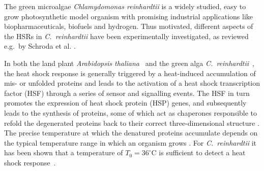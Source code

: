 \documentclass[oneside, 10pt, a4paper, twocolumn]{article}
\begin{document}
The green microalgae \emph{Chlamydomonas reinhardtii} %
is a widely studied, easy to grow photosynthetic model organism with promising  industrial applications like biopharmaceuticals, biofuels and hydrogen. 
Thus motivated, different aspects of the HSRs in \emph{C.~reinhardtii} have been experimentally investigated, as reviewed e.g.~by Schroda et al. \cite{Schroda2015}.


In both the land plant \textit{Arabidopsis thaliana}~\cite{Kurepa2003,Sugio2009} and the green alga \textit{C.~reinhardtii}~\cite{Schmollinger2013},
the heat shock response is generally triggered by a heat-induced accumulation of mis- or unfolded proteins
and leads to the activation
of a heat shock transcription factor (HSF)  through a series of sensor and signalling events. The HSF in turn promotes the expression of 
heat shock protein (HSP) genes, and subsequently leads to the synthesis of proteins, some of which act as chaperones responsible to refold the degenerated proteins back to
their correct three-dimensional structure \cite{Craig1993}. 
The precise temperature at which the denatured proteins accumulate depends on the typical temperature range
in which an organism grows \cite{Lindquist1988}. 
For \textit{C.~reinhardtii}
it has been shown that a temperature of $T_0 = 36^\circ\text{C}$ is sufficient to detect a heat shock response~\cite{Kobayashi2014}.
\end{document}
